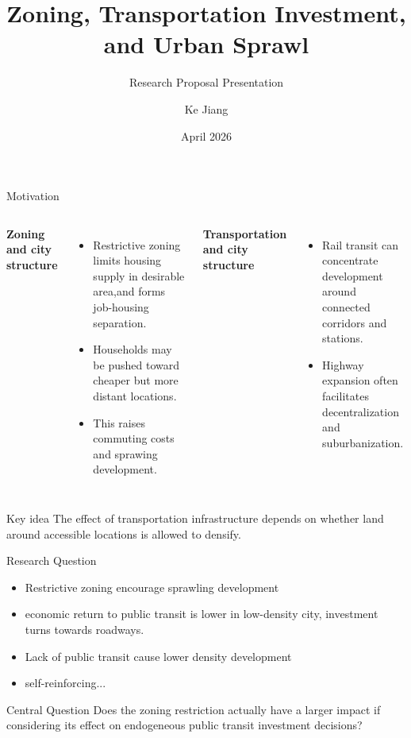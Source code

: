 \documentclass[10pt]{beamer}
\title[Zoning and Transportation]{Zoning, Transportation Investment,\\ and Urban Sprawl}
\subtitle{Research Proposal Presentation}
\author{Ke Jiang}
\institute{Southern Methodist University}
\date{April 2026}
\begin{document}
\begin{frame}
  \titlepage
\end{frame}


\begin{frame}{Motivation}
\begin{columns}[T]
\textbf{Zoning and city structure}
\begin{itemize}
    \item Restrictive zoning limits housing supply in desirable area,and forms job-housing separation.
    \item Households may be pushed toward cheaper but more distant locations.
    \item This raises commuting costs and sprawing development.
\end{itemize}


\textbf{Transportation and city structure}
\begin{itemize}
    \item Rail transit can concentrate development around connected corridors and stations.
    \item Highway expansion often facilitates decentralization and suburbanization.
\end{itemize}
\end{columns}

\vspace{0.4cm}
\begin{alertblock}{Key idea}
The effect of transportation infrastructure depends on whether land around accessible locations is allowed to densify.
\end{alertblock}
\end{frame}

\begin{frame}{Research Question}
\begin{itemize}
    \item Restrictive zoning encourage sprawling development
    \item economic return to public transit is lower in low-density city\citep{Severen2021-oi}, investment turns towards roadways.
    \item Lack of public transit cause lower density development
        \item self-reinforcing...
\end{itemize}

\vspace{0.4cm}
\begin{block}{Central Question}
Does the zoning restriction actually have a larger impact if considering its effect on endogeneous public transit investment decisions?
\end{block}
\end{frame}
\end{document}
